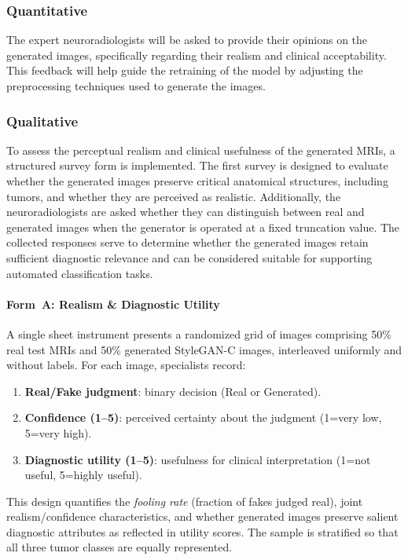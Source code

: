 \subsubsection{Quantitative}

The expert neuroradiologists will be asked to provide their opinions on the generated images, specifically regarding their realism and clinical acceptability. This feedback will help guide the retraining of the model by adjusting the preprocessing techniques used to generate the images.

\subsubsection{Qualitative}

To assess the perceptual realism and clinical usefulness of the generated MRIs, a structured survey form is implemented. The first survey is designed to evaluate whether the generated images preserve critical anatomical structures, including tumors, and whether they are perceived as realistic. Additionally, the neuroradiologists are asked whether they can distinguish between real and generated images when the generator is operated at a fixed truncation value. The collected responses serve to determine whether the generated images retain sufficient diagnostic relevance and can be considered suitable for supporting automated classification tasks.


\paragraph{Form~A: Realism \& Diagnostic Utility}
A single sheet instrument presents a randomized grid of images comprising 50\% real test MRIs and 50\% generated StyleGAN-C images, interleaved uniformly and without labels. For each image, specialists record:
\begin{enumerate}[leftmargin=*, itemsep=2pt]
  \item \textbf{Real/Fake judgment}: binary decision (Real or Generated).
  \item \textbf{Confidence (1--5)}: perceived certainty about the judgment (1{=}very low, 5{=}very high).
  \item \textbf{Diagnostic utility (1--5)}: usefulness for clinical interpretation (1{=}not useful, 5{=}highly useful).
\end{enumerate}
This design quantifies the \emph{fooling rate} (fraction of fakes judged real), joint realism/confidence characteristics, and whether generated images preserve salient diagnostic attributes as reflected in utility scores. The sample is stratified so that all three tumor classes are equally represented. 


